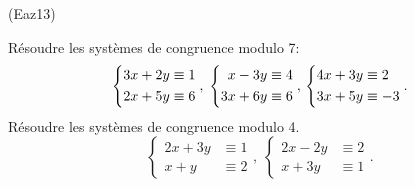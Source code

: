 \begin{tiny}(Eaz13)\end{tiny} Résoudre les systèmes de congruence modulo 7:
\[
\left\lbrace 
\begin{aligned}
  3 x + 2y &\equiv 1 \\ 2x + 5y &\equiv 6
\end{aligned}
\right., \;
\left\lbrace 
\begin{aligned}
  x - 3y &\equiv 4 \\ 3x + 6y &\equiv 6
\end{aligned}
\right., \\
\left\lbrace 
\begin{aligned}
  4 x + 3y &\equiv 2 \\ 3x + 5y &\equiv -3
\end{aligned}
\right. .
\]
Résoudre les systèmes de congruence modulo 4.
\[
\left\lbrace 
\begin{aligned}
  2 x + 3y &\equiv 1 \\ x + y &\equiv 2
\end{aligned}
\right., \;
\left\lbrace 
\begin{aligned}
  2x - 2y &\equiv 2 \\ x + 3y &\equiv 1
\end{aligned}
\right. .
\]
